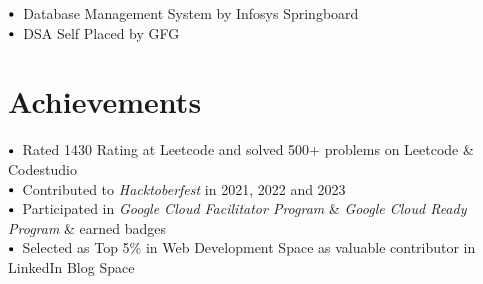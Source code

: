 \documentclass[letterpaper,11pt]{article}
\newcommand\sbullet[1][.5]{\mathbin{\vcenter{\hbox{\scalebox{#1}{$\bullet$}}}}}
\begin{document}
$\sbullet[.75] \hspace{0.1cm}$ 
{{Database Management System by Infosys Springboard}} {\href{https://drive.google.com/file/d/157A4t4jEd70He6MUfn_pGqL71G5tFLHH/view?usp=sharing}{\raisebox{-0.1\height}\faExternalLink }}
\hspace{2cm}\\

$\sbullet[.75] \hspace{0.1cm}$ 
{{DSA Self Placed by GFG}} {\href{https://drive.google.com/file/d/1tUcDkbx12nVkwR38cpsBqsf_m8_BCjLr/view?usp=sharing}{\raisebox{-0.1\height}\faExternalLink }}
\hspace{6cm}\\

\section{Achievements}

$\sbullet[.75] \hspace{0.2cm}${{Rated 1430 Rating at Leetcode and solved 500+ problems on Leetcode \& Codestudio}} {\href{https://leetcode.com/keshavop/}{\raisebox{-0.1\height}\faExternalLink }}  
\hspace{2cm}\\

$\sbullet[.75] \hspace{0.2cm}${{Contributed to \textit{Hacktoberfest} in 2021, 2022 and 2023}} {\href{https://drive.google.com/file/d/11qa8d9tDFXLJiDeccjvG6gAMsaZidgY7/view?usp=sharing}{\raisebox{-0.1\height}\faExternalLink }}
\hspace{2cm}\\

$\sbullet[.75] \hspace{0.2cm}${{Participated in \textit{Google Cloud Facilitator Program} \& \textit{Google Cloud Ready Program} \& earned badges}} {\href{https://www.cloudskillsboost.google/public_profiles/792a8b6a-c5e8-4b7f-a4b4-6245803d471c}{\raisebox{-0.1\height}\faExternalLink }}
\hspace{2cm}\\

$\sbullet[.75] \hspace{0.2cm}${{Selected as Top 5\% in Web Development Space as valuable contributor in LinkedIn Blog Space}}
\hspace{2cm}\\

 \vspace{2pt}
\end{document}
